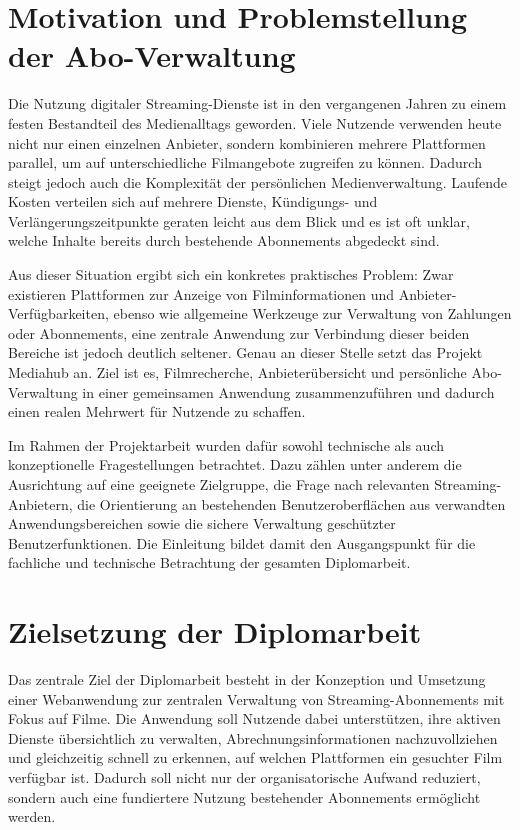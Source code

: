 \section{Motivation und Problemstellung der Abo-Verwaltung}
Die Nutzung digitaler Streaming-Dienste ist in den vergangenen Jahren zu einem festen Bestandteil des Medienalltags geworden. Viele Nutzende verwenden heute nicht nur einen einzelnen Anbieter, sondern kombinieren mehrere Plattformen parallel, um auf unterschiedliche Filmangebote zugreifen zu können. Dadurch steigt jedoch auch die Komplexität der persönlichen Medienverwaltung. Laufende Kosten verteilen sich auf mehrere Dienste, Kündigungs- und Verlängerungszeitpunkte geraten leicht aus dem Blick und es ist oft unklar, welche Inhalte bereits durch bestehende Abonnements abgedeckt sind.

Aus dieser Situation ergibt sich ein konkretes praktisches Problem: Zwar existieren Plattformen zur Anzeige von Filminformationen und Anbieter-Verfügbarkeiten, ebenso wie allgemeine Werkzeuge zur Verwaltung von Zahlungen oder Abonnements, eine zentrale Anwendung zur Verbindung dieser beiden Bereiche ist jedoch deutlich seltener. Genau an dieser Stelle setzt das Projekt \glqq Mediahub\grqq{} an. Ziel ist es, Filmrecherche, Anbieterübersicht und persönliche Abo-Verwaltung in einer gemeinsamen Anwendung zusammenzuführen und dadurch einen realen Mehrwert für Nutzende zu schaffen.

Im Rahmen der Projektarbeit wurden dafür sowohl technische als auch konzeptionelle Fragestellungen betrachtet. Dazu zählen unter anderem die Ausrichtung auf eine geeignete Zielgruppe, die Frage nach relevanten Streaming-Anbietern, die Orientierung an bestehenden Benutzeroberflächen aus verwandten Anwendungsbereichen sowie die sichere Verwaltung geschützter Benutzerfunktionen. Die Einleitung bildet damit den Ausgangspunkt für die fachliche und technische Betrachtung der gesamten Diplomarbeit.

\section{Zielsetzung der Diplomarbeit}
Das zentrale Ziel der Diplomarbeit besteht in der Konzeption und Umsetzung einer Webanwendung zur zentralen Verwaltung von Streaming-Abonnements mit Fokus auf Filme. Die Anwendung soll Nutzende dabei unterstützen, ihre aktiven Dienste übersichtlich zu verwalten, Abrechnungsinformationen nachzuvollziehen und gleichzeitig schnell zu erkennen, auf welchen Plattformen ein gesuchter Film verfügbar ist. Dadurch soll nicht nur der organisatorische Aufwand reduziert, sondern auch eine fundiertere Nutzung bestehender Abonnements ermöglicht werden.

